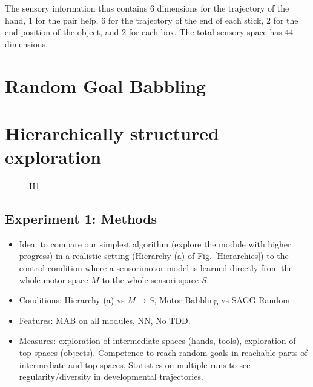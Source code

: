 \documentclass[conference]{include/IEEEtran}
\begin{document}
		The sensory information thus contains $6$ dimensions for the trajectory of the hand, $1$ for the pair help, $6$ for the trajectory of the end of each stick, $2$ for the end position of the object, and $2$ for each box.
		The total sensory space has $44$ dimensions.
		
	
	
%
	
\section{Random Goal Babbling}


	
%


\section{Hierarchically structured exploration}


	\begin{figure}[!t]
		\center
		
		\caption{H1}
		\label{H1}					
	\end{figure}
	
	
	\subsection{Experiment 1: Methods}		
				
		\begin{itemize}
			\item Idea: to compare our simplest algorithm (explore the module with higher progress) in a realistic setting (Hierarchy (a) of Fig. \ref{Hierarchies}) to the control condition where a sensorimotor model is learned
					directly from the whole motor space $M$ to the whole sensori space $S$.
			
			\item Conditions: Hierarchy (a) vs $M \rightarrow S$, Motor Babbling vs SAGG-Random
			
			\item Features: MAB on all modules, NN, No TDD.
			
			\item Measures: exploration of intermediate spaces (hands, tools), exploration of top spaces (objects). Competence to reach random goals in reachable parts of intermediate and top spaces. 
					Statistics on multiple runs to see regularity/diversity in developmental trajectories.
		\end{itemize}
		
\end{document}

